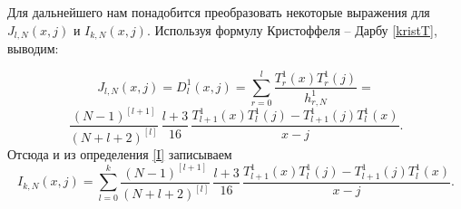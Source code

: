 \documentclass[12pt]{book}
\begin{document}

Для дальнейшего нам понадобится преобразовать некоторые выражения для $J_{l,N}(x,j)$ и $I_{k,N}(x,j)$.
Используя формулу Кристоффеля -- Дарбу \eqref{kristT}, выводим:

\begin{equation*}
  J_{l,N} (x,j) = D^{1}_{l} (x,j) =
  \sum_{r=0}^{l} \frac{T^{1}_{r}(x) T^{1}_{r}(j)}{h^{1}_{r,N}} =
\end{equation*}
\begin{equation}\label{krist}
  \frac{(N-1)^{[l+1]}}{(N+l+2)^{[l]}} \, \frac{l+3}{16}\,
  \frac{T_{l+1}^1(x) T_{l}^1(j) - T_{l+1}^1(j) T_{l}^1(x)}{x-j}.
\end{equation}
Отсюда и из определения \eqref{I} записываем%
\begin{equation*}
  I_{k,N}(x,j) = %
  \sum_{l=0}^{k} \frac{(N-1)^{[l+1]}}{(N+l+2)^{[l]}}\,\frac{l+3}{16}\,
  \frac{T_{l+1}^1(x) T_{l}^1(j) - T_{l+1}^1(j) T_{l}^1(x)}{x-j}.
\end{equation*}
\end{document}
